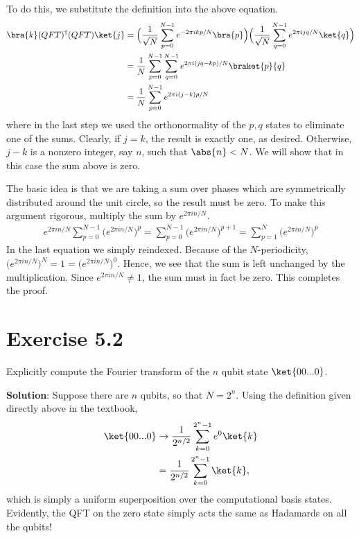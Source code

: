 \documentclass{book}
\begin{document}
    To do this, we substitute the definition into the above equation. 
    \begin{align} \label{eq:5.1:expand_and_simplify}
    \begin{aligned}
        \bra{k}(QFT)^\dagger(QFT)\ket{j} &= \Big(\frac{1}{\sqrt{N}}\sum_{p=0}^{N-1}e^{-2\pi ikp/N}\bra{p}\Big)\Big(\frac{1}{\sqrt{N}}\sum_{q=0}^{N-1}e^{2\pi ijq/N}\ket{q}\Big) \\
        &= \frac{1}{N}\sum_{p=0}^{N-1}\sum_{q=0}^{N-1}e^{2\pi i(jq-kp)/N}\braket{p}{q} \\
        &= \frac{1}{N}\sum_{p=0}^{N-1} e^{2\pi i (j-k)p/N}
    \end{aligned}
    \end{align}
    where in the last step we used the orthonormality of the $p,q$ states to eliminate one of the sums. Clearly, if $j=k$, the result is exactly one, as desired. Otherwise, $j-k$ is a nonzero integer, say $n$, such that $\abs{n}<N$. We will show that in this case the sum above is zero. 
    
    The basic idea is that we are taking a sum over phases which are symmetrically distributed around the unit circle, so the result must be zero. To make this argument rigorous, multiply the sum by $e^{2\pi i n/N}$.
    \begin{align}
        e^{2\pi i n/N}\sum_{p=0}^{N-1}\big(e^{2\pi i n/N}\big)^p = \sum_{p=0}^{N-1}\big(e^{2\pi i n/N}\big)^{p+1} = \sum_{p=1}^{N}\big(e^{2\pi i n/N}\big)^{p}
    \end{align}
    In the last equation we simply reindexed. Because of the $N$-periodicity, $\big(e^{2\pi i n/N}\big)^N = 1 = \big(e^{2\pi i n/N}\big)^0$. Hence, we see that the sum is left unchanged by the multiplication. Since $e^{2\pi i n/N} \neq 1$, the sum must in fact be zero. This completes the proof.

\section*{Exercise 5.2}
    Explicitly compute the Fourier transform of the $n$ qubit state $\ket{00...0}$.
    
    \textbf{Solution}: Suppose there are $n$ qubits, so that $N=2^n$. Using the definition given directly above in the textbook,
    \begin{align}
        \ket{00...0} &\rightarrow \frac{1}{2^{n/2}} \sum_{k=0}^{2^n-1}e^0 \ket{k} \\
        &= \frac{1}{2^{n/2}}\sum_{k=0}^{2^n-1}\ket{k},
    \end{align}
    which is simply a uniform superposition over the computational basis states. Evidently, the QFT on the zero state simply acts the same as Hadamards on all the qubits!
    
\end{document}
